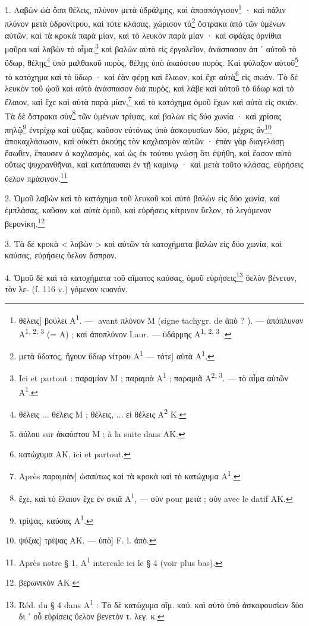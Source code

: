 \documentclass[a4paper, 11pt, oneside, polutonikogreek, french]{article}
\newcommand*\svgB{}
\begin{document}
1. Λαβὼν ὠὰ ὅσα θέλεις, πλύνον μετὰ ὑδράλμης, καὶ ἀποσπόγγισον\footnote{θέλεις] βούλει A\textsuperscript{1}. --- $\svgB$ avant πλύνον M (signe tachygr. de ἀπὸ ? ). --- ἀπόπλυνον A\textsuperscript{1, 2, 3} (= A) ; καὶ ἀποπλύνον Laur. --- ὑδάρμης A\textsuperscript{1, 2, 3} .} · καὶ πάλιν πλύνον μετὰ ὑδρονίτρου, καὶ τότε κλάσας, χώρισον τὰ\footnote{μετὰ ὕδατος, ἤγουν ὕδωρ νίτρου A\textsuperscript{1} --- τότε] αὐτὰ A\textsuperscript{1}.} ὄστρακα ἀπὸ τῶν ὑμένων αὐτῶν, καὶ τὰ κροκὰ παρὰ μίαν, καὶ τὸ λευκὸν παρὰ μίαν · καὶ σφάξας ὀρνίθια μαῦρα καὶ λαβὼν τὸ αἷμα,\footnote{Ici et partout : παραμίαν M ; παραμιὰ A\textsuperscript{1} ; παραμιᾶ A\textsuperscript{2, 3}. --- τὸ αἷμα αὐτῶν A\textsuperscript{1}.} καὶ βαλὼν αὐτὸ εἰς ἐργαλεῖον, ἀνάσπασον ἀπ ᾽ αὐτοῦ τὸ ὕδωρ, θέλῃς\footnote{θέλεις ... θέλεις M ; θέλεις, ... εἰ θέλεις A\textsuperscript{2} K.} ὑπὸ μαλθακοῦ πυρὸς, θέλῃς ὑπὸ ἀκαύστου πυρὸς. Καὶ φύλαξον αὐτοῦ\footnote{ἀύλου sur ἀκαύστου M ; à la suite dans AK.} τὸ κατόχημα καὶ τὸ ὕδωρ · καὶ ἐὰν φέρῃ καὶ ἔλαιον, καὶ ἔχε αὐτὰ\footnote{κατώχυμα AK, ici et partout.} εἰς σκιάν. Τὸ δὲ λευκὸν τοῦ ᾠοῦ καὶ αὐτὸ ἀνάσπασον διὰ πυρὸς, καὶ λάβε καὶ αὐτοῦ τὸ ὕδωρ καὶ τὸ ἔλαιον, καὶ ἔχε καὶ αὐτὰ παρὰ μίαν,\footnote{Après παραμιὰν] ὡσαύτως καὶ τὰ κροκὰ καὶ τὸ κατώχυμα A\textsuperscript{1}.} καὶ τὸ κατόχημα ὁμοῦ ἔχων καὶ αὐτὰ εἰς σκιάν. Τὰ δὲ ὄστρακα σὺν\footnote{ἔχε, καὶ τὸ ἔλαιον ἔχε ἐν σκιᾶ A\textsuperscript{1}, --- σὺν pour μετὰ ; σὺν avec le datif AK.} τῶν ὑμένων τρίψας, καὶ βαλὼν εἰς δύο χωνία · καὶ χρίσας πηλῷ\footnote{τρίψας, καύσας A\textsuperscript{1}.} ἐντρίχῳ καὶ ψύξας, καῦσον εὐτόνως ὑπὸ ἀσκοφυσίων δύο, μέχρις ἂν\footnote{ψύξας] τρίψας AK. --- ὑπὸ] F. l. ἀπὸ.} ἀποκαχλάσωσιν, καὶ οὐκέτι ἀκούῃς τὸν καχλασμὸν αὐτῶν · ἐπὰν γὰρ διαγελάσῃ ἔσωθεν, ἔπαυσεν ὁ καχλασμὸς, καὶ ὡς ἐκ τούτου γνώσῃ ὅτι ἐψήθη, καὶ ἔασον αὐτὸ οὕτως ψυχρανθῆναι, καὶ κατάπαυσαι ἐν τῇ καμίνῳ · καὶ μετὰ τοῦτο κλάσας, εὑρήσεις ὕελον πράσινον.\footnote{Après notre § 1, A\textsuperscript{1} intercale ici le § 4 (voir plus bas).}

2. Ὁμοῦ λαβὼν καὶ τὸ κατόχημα τοῦ λευκοῦ καὶ αὐτὸ βαλὼν εἰς δύο χωνία, καὶ ἐμπλάσας, καῦσον καὶ αὐτὰ ὁμοῦ, καὶ εὑρήσεις κίτρινον ὕελον, τὸ λεγόμενον βερονίκη.\footnote{βερωνικὸν AK.}

3. Τὰ δέ κροκὰ < λαβὼν > καὶ αὐτῶν τὰ κατοχήματα βαλὼν εἰς δύο χωνία, καὶ καύσας, εὑρήσεις ὕελον ἄσπρον.

4. Ὁμοῦ δὲ καὶ τὰ κατοχήματα τοῦ αἵματος καύσας, ὁμοῦ εὑρήσεις\footnote{Réd. du § 4 dans A\textsuperscript{1} : Τὸ δὲ κατώχυμα αἵμ. καύ. καὶ αὐτὸ ὑπὸ ἀσκοφουσίων δύο δι ᾽ οὗ εὑρίσεις ὕελον βενετὸν τ. λεγ. κ.} ὕελὸν βένετον, τὸν λε- (f. 116 v.) γόμενον κυανόν.
\end{document}
